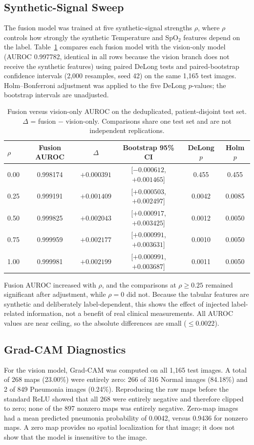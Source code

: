 \documentclass[11pt,a4paper]{article}
\begin{document}
\subsection{Synthetic-Signal Sweep}
The fusion model was trained at five synthetic-signal strengths $\rho$, where
$\rho$ controls how strongly the synthetic Temperature and SpO$_2$ features
depend on the label. Table~\ref{tab:dedup-rho} compares each fusion model with
the vision-only model (AUROC 0.997782, identical in all rows because the vision
branch does not receive the synthetic features) using paired DeLong tests and
paired-bootstrap confidence intervals (2,000 resamples, seed 42) on the same
1,165 test images. Holm--Bonferroni adjustment was applied to the five DeLong
$p$-values; the bootstrap intervals are unadjusted.

\begin{table}[htbp]
\centering
\caption{Fusion versus vision-only AUROC on the deduplicated, patient-disjoint test
set. $\Delta$ = fusion $-$ vision-only. Comparisons share one test set and are not
independent replications.}
\label{tab:dedup-rho}
\small
\begin{tabular}{lccccc}
\toprule
$\rho$ & Fusion AUROC & $\Delta$ & Bootstrap 95\% CI & DeLong $p$ & Holm $p$ \\
\midrule
0.00 & 0.998174 & $+0.000391$ & [$-0.000612$, $+0.001465$] & 0.455 & 0.455 \\
0.25 & 0.999191 & $+0.001409$ & [$+0.000503$, $+0.002497$] & 0.0042 & 0.0085 \\
0.50 & 0.999825 & $+0.002043$ & [$+0.000917$, $+0.003425$] & 0.0012 & 0.0050 \\
0.75 & 0.999959 & $+0.002177$ & [$+0.000991$, $+0.003631$] & 0.0010 & 0.0050 \\
1.00 & 0.999981 & $+0.002199$ & [$+0.000991$, $+0.003687$] & 0.0011 & 0.0050 \\
\bottomrule
\end{tabular}
\end{table}

Fusion AUROC increased with $\rho$, and the comparisons at $\rho\geq0.25$
remained significant after adjustment, while $\rho=0$ did not. Because the
tabular features are synthetic and deliberately label-dependent, this shows the
effect of injected label-related information, not a benefit of real clinical
measurements. All AUROC values are near ceiling, so the absolute differences
are small ($\leq0.0022$).

\subsection{Grad-CAM Diagnostics}
For the vision model, Grad-CAM was computed on all 1,165 test images. A total of
268 maps (23.00\%) were entirely zero: 266 of 316 Normal images (84.18\%) and 2
of 849 Pneumonia images (0.24\%). Reproducing the raw maps before the standard
ReLU showed that all 268 were entirely negative and therefore clipped to zero;
none of the 897 nonzero maps was entirely negative. Zero-map images had a mean
predicted pneumonia probability of 0.0042, versus 0.9436 for nonzero maps. A zero
map provides no spatial localization for that image; it does not show that the
model is insensitive to the image.
\end{document}
